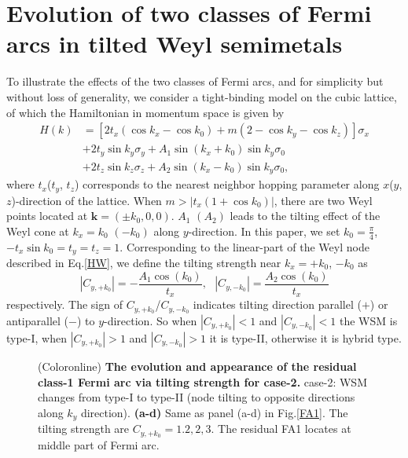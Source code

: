 \documentclass[twocolumn,superscriptaddress]{revtex4}%
\begin{document}
\section{Evolution of two classes of Fermi arcs in tilted Weyl semimetals}\label{sec3}
    To illustrate the effects of the two classes of
Fermi arcs, and for simplicity but without loss of generality, we consider a
tight-binding model on the cubic lattice, of which the Hamiltonian in momentum
space is given by%
\begin{align}
H(k)  &  =[2t_{x}(\cos k_{x}-\cos k_{0})+m(2-\cos k_{y}-\cos k_{z})]\sigma
_{x}\nonumber \\
&  +2t_{y}\sin k_{y}\sigma_{y}+A_{1}\sin(k_{x}+k_{0})\sin k_{y}\sigma
_{0}\nonumber \\
&  +2t_{z}\sin k_{z}\sigma_{z}+A_{2}\sin(k_{x}-k_{0})\sin k_{y}\sigma_{0},
\end{align}
where $t_{x}$($t_{y}$, $t_{z}$) corresponds to the nearest neighbor hopping
parameter along $x$($y$, $z$)-direction of the lattice. When $m>|t_{x}(1+\cos
k_{0})|$, there are two Weyl points located at $\mathbf{k}=(\pm k_{0},0,0)$.
$A_{1}$ $(A_{2})$ leads to the tilting effect of the Weyl cone at $k_{x}%
=k_{0}$ $(-k_{0})$ along $y$-direction. In this paper, we set $k_{0}=\frac
{\pi}{4}$, $-t_{x}\sin k_{0}=t_{y}=t_{z}=1$. Corresponding to the linear-part of the Weyl node described in Eq.\ref{HW}, we define the tilting strength  near $k_{x}=+k_{0}$, $-k_{0}$ as
\begin{equation}
|C_{y,+k_{0}}|=-\frac{A_{1}\cos(k_{0})}{t_{x}},\text{ \  \ }|C_{y,-k_{0}%
}|=\frac{A_{2}\cos(k_{0})}{t_{x}}%
\end{equation}
respectively. The sign of $C_{y,+k_{0}}$/$C_{y,-k_{0}}$ indicates tilting
direction parallel ($+$) or antiparallel ($-$) to $y$-direction. So when
$|C_{y,+k_{0}}|<1$ and $|C_{y,-k_{0}}|<1$ the WSM is type-I, when
$|C_{y,+k_{0}}|>1$ and $|C_{y,-k_{0}}|>1$ it is type-II, otherwise it is
hybrid type.
\begin{figure}[t]
\caption{(Coloronline) \textbf{The evolution and appearance of the residual class-1 Fermi arc via tilting strength for case-2.} case-2: WSM changes from type-I to
type-II (node tilting to opposite directions along $k_{y}$ direction). \textbf{(a-d)} Same as panel (a-d) in Fig.\ref{FA1}. The tilting strength are $C_{y,+k_{0}}=1.2,2,3$. The residual FA1 locates at middle part of Fermi arc.}
\label{FA2}
\end{figure}
\end{document}
